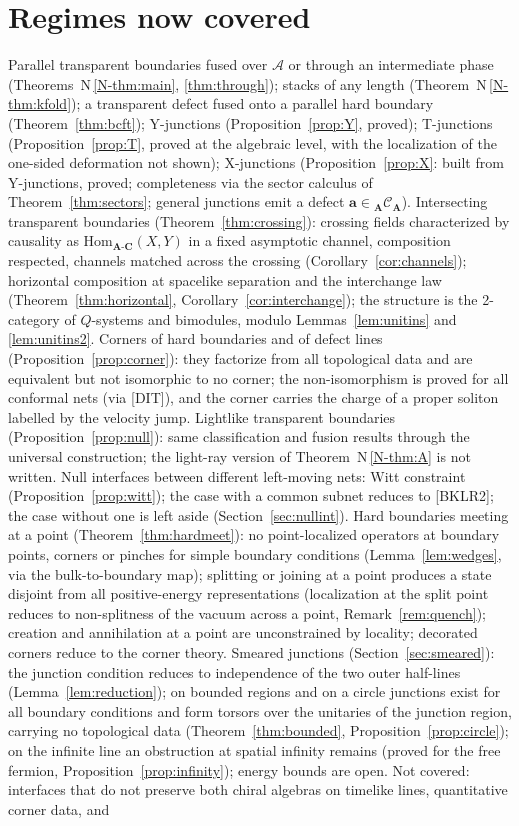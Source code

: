 \documentclass[11pt]{article}
\theoremstyle{definition}
\theoremstyle{remark}
\newcommand{\cA}{\mathcal A}
\newcommand{\bfA}{\mathbf A}
\newcommand{\bfC}{\mathbf C}
\newcommand{\nref}[1]{N\,\ref{N-#1}}
\begin{document}
\section{Regimes now covered}
Parallel transparent boundaries fused over $\cA$ or through an intermediate phase (Theorems~\nref{thm:main}, \ref{thm:through}); stacks of any length (Theorem~\nref{thm:kfold}); a transparent defect fused onto a parallel hard boundary (Theorem~\ref{thm:bcft}); Y-junctions (Proposition~\ref{prop:Y}, proved); T-junctions (Proposition~\ref{prop:T}, proved at the algebraic level, with the localization of the one-sided deformation not shown); X-junctions (Proposition~\ref{prop:X}: built from Y-junctions, proved; completeness via the sector calculus of Theorem~\ref{thm:sectors}; general junctions emit a defect $\mathbf a\in{}_{\bfA}\mathcal C_{\bfA}$). Intersecting transparent boundaries (Theorem~\ref{thm:crossing}): crossing fields characterized by causality as $\mathrm{Hom}_{\bfA\text{-}\bfC}(X,Y)$ in a fixed asymptotic channel, composition respected, channels matched across the crossing (Corollary~\ref{cor:channels}); horizontal composition at spacelike separation and the interchange law (Theorem~\ref{thm:horizontal}, Corollary~\ref{cor:interchange}); the structure is the 2-category of $Q$-systems and bimodules, modulo Lemmas~\ref{lem:unitins} and \ref{lem:unitins2}. Corners of hard boundaries and of defect lines (Proposition~\ref{prop:corner}): they factorize from all topological data and are equivalent but not isomorphic to no corner; the non-isomorphism is proved for all conformal nets (via [DIT]), and the corner carries the charge of a proper soliton labelled by the velocity jump. Lightlike transparent boundaries (Proposition~\ref{prop:null}): same classification and fusion results through the universal construction; the light-ray version of Theorem~\nref{thm:A} is not written. Null interfaces between different left-moving nets: Witt constraint (Proposition~\ref{prop:witt}); the case with a common subnet reduces to [BKLR2]; the case without one is left aside (Section~\ref{sec:nullint}). Hard boundaries meeting at a point (Theorem~\ref{thm:hardmeet}): no point-localized operators at boundary points, corners or pinches for simple boundary conditions (Lemma~\ref{lem:wedges}, via the bulk-to-boundary map); splitting or joining at a point produces a state disjoint from all positive-energy representations (localization at the split point reduces to non-splitness of the vacuum across a point, Remark~\ref{rem:quench}); creation and annihilation at a point are unconstrained by locality; decorated corners reduce to the corner theory. Smeared junctions (Section~\ref{sec:smeared}): the junction condition reduces to independence of the two outer half-lines (Lemma~\ref{lem:reduction}); on bounded regions and on a circle junctions exist for all boundary conditions and form torsors over the unitaries of the junction region, carrying no topological data (Theorem~\ref{thm:bounded}, Proposition~\ref{prop:circle}); on the infinite line an obstruction at spatial infinity remains (proved for the free fermion, Proposition~\ref{prop:infinity}); energy bounds are open. Not covered: interfaces that do not preserve both chiral algebras on timelike lines, quantitative corner data, and 
\end{document}
